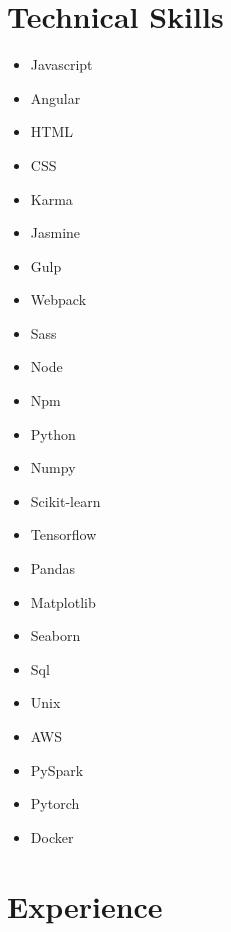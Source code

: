 \documentclass[10pt]{article}
\begin{document}
	\section{Technical Skills}
		\begin{multicols}{4}
			\begin{itemize}[noitemsep]
				\item Javascript 
				\item Angular 
				\item HTML 
				\item CSS 
				\item Karma 
				\item Jasmine 
				\columnbreak 
				
				\item Gulp 
				\item Webpack
				\item Sass
				\item Node 
				\item Npm 
				\item Python 
				\columnbreak 
				
				\item Numpy 
				\item Scikit-learn 
				\item Tensorflow 
				\item Pandas 
				\item Matplotlib
				\item Seaborn 
				\columnbreak
				
				\item Sql 
				\item Unix 
				\item AWS 
				\item PySpark
				\item Pytorch
				\item Docker
			\end{itemize}
		\end{multicols}
		
	\section{Experience}
\end{document}

